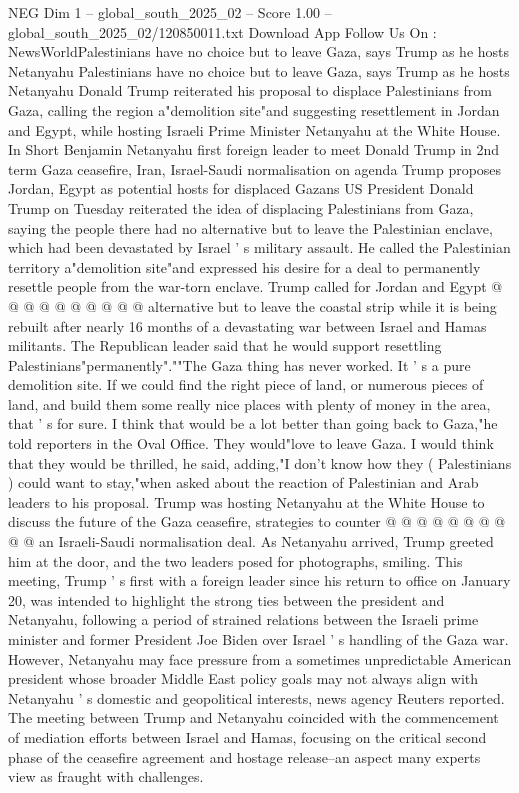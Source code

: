 \begin{textsample}{NEG Dim 1 – global\_south\_2025\_02 – Score 1.00 – global\_south\_2025\_02/120850011.txt}  \label{ex:f1_neg_092}
Download App Follow Us On : NewsWorldPalestinians have no choice but to leave Gaza, says Trump as he hosts Netanyahu Palestinians have no choice but to leave Gaza, says Trump as he hosts Netanyahu Donald Trump reiterated his proposal to displace Palestinians from Gaza, calling the region a"demolition site"and suggesting resettlement in Jordan and Egypt, while hosting Israeli Prime Minister Netanyahu at the White House.
In Short Benjamin Netanyahu first foreign leader to meet Donald Trump in 2nd term Gaza ceasefire, Iran, Israel-Saudi normalisation on agenda Trump proposes Jordan, Egypt as potential hosts for displaced Gazans US President Donald Trump on Tuesday reiterated the idea of displacing Palestinians from Gaza, saying the people there had no alternative but to leave the Palestinian enclave, which had been devastated by Israel ' s military assault.
He called the Palestinian territory a"demolition site"and expressed his desire for a deal to permanently resettle people from the war-torn enclave.
Trump called for Jordan and Egypt @ @ @ @ @ @ @ @ @ @ alternative but to leave the coastal strip while it is being rebuilt after nearly 16 months of a devastating war between Israel and Hamas militants.
The Republican leader said that he would support resettling Palestinians"permanently".""The Gaza thing has never worked.
It ' s a pure demolition site.
If we could find the right piece of land, or numerous pieces of land, and build them some really nice places with plenty of money in the area, that ' s for sure.
I think that would be a lot better than going back to Gaza,"he told reporters in the Oval Office.
They would"love to leave Gaza.
I would think that they would be thrilled, he said, adding,"I don't know how they ( Palestinians ) could want to stay,"when asked about the reaction of Palestinian and Arab leaders to his proposal.
Trump was hosting Netanyahu at the White House to discuss the future of the Gaza ceasefire, strategies to counter @ @ @ @ @ @ @ @ @ @ an Israeli-Saudi normalisation deal.
As Netanyahu arrived, Trump greeted him at the door, and the two leaders posed for photographs, smiling.
This meeting, Trump ' s first with a foreign leader since his return to office on January 20, was intended to highlight the strong ties between the president and Netanyahu, following a period of strained relations between the Israeli prime minister and former President Joe Biden over Israel ' s handling of the Gaza war.
However, Netanyahu may face pressure from a sometimes unpredictable American president whose broader Middle East policy goals may not always align with Netanyahu ' s domestic and geopolitical interests, news agency Reuters reported.
The meeting between Trump and Netanyahu coincided with the commencement of mediation efforts between Israel and Hamas, focusing on the critical second phase of the ceasefire agreement and hostage release--an aspect many experts view as fraught with challenges.

\end{textsample}
